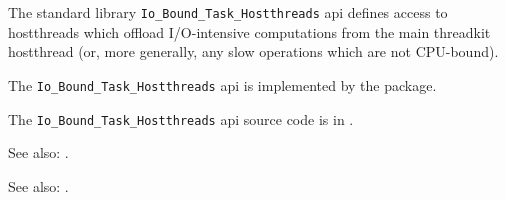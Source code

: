 
The standard library {\tt Io\_Bound\_Task\_Hostthreads} api defines access to hostthreads which offload 
I/O-intensive computations from the main threadkit hostthread (or, more generally, any slow 
operations which are not CPU-bound).

The {\tt Io\_Bound\_Task\_Hostthreads} api is implemented by the  package.

The {\tt Io\_Bound\_Task\_Hostthreads} api source code is in .

See also:   .

See also:   .
